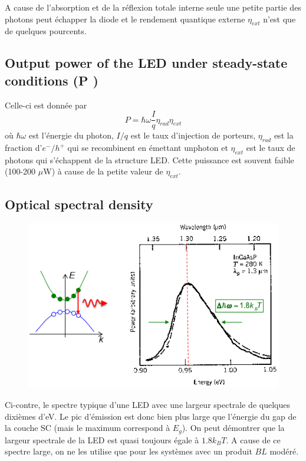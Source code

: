 A cause de l'absorption et de la réflexion totale interne seule une petite partie des photons peut
échapper la diode et le rendement quantique externe $\eta_{ext}$ n'est que de quelques pourcents.

\subsection{Output power of the LED under steady-state conditions (P )}
Celle-ci est donnée par
\begin{equation}
P = \hbar \omega \frac{I}{q}{\eta _{rad}}{\eta _{ext}}
\end{equation}
où $\hbar\omega$ est l'énergie du photon, $I/q$ est le taux d'injection de porteurs, $\eta_{rad}$
est la fraction d'$e^-/h^+$ qui se recombinent en émettant unphoton et $\eta_{ext}$ est le taux de
photons qui s'échappent de la structure LED. Cette puissance est souvent faible (100-200 $\mu$W) à
cause de la petite valeur de $\eta_{ext}$.


\subsection{Optical spectral density}
	\begin{figure}
	\vspace{-10mm}
	\includegraphics[scale=0.45]{ch4/image8}
	\end{figure}
Ci-contre, le spectre typique d'une LED avec une largeur spectrale de quelques dixièmes d'eV. Le
pic d'émission est donc bien plus large que l'énergie du gap de la couche SC (mais le maximum 
correspond à $E_g$). On peut démontrer que la largeur spectrale de la LED est quasi toujours égale à $1.8k_BT$. A cause de ce spectre large, on ne les utilise que pour les systèmes avec un produit $BL$ modéré.


